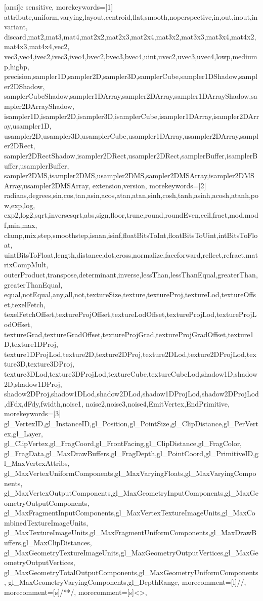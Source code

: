  
[ansi]{c}{%
  sensitive,
  morekeywords=[1]{%
    attribute,uniform,varying,layout,centroid,flat,smooth,noperspective,in,out,inout,invariant,
    discard,mat2,mat3,mat4,mat2x2,mat2x3,mat2x4,mat3x2,mat3x3,mat3x4,mat4x2,mat4x3,mat4x4,vec2,
    vec3,vec4,ivec2,ivec3,ivec4,bvec2,bvec3,bvec4,uint,uvec2,uvec3,uvec4,lowp,mediump,highp,
    precision,sampler1D,sampler2D,sampler3D,samplerCube,sampler1DShadow,sampler2DShadow,
    samplerCubeShadow,sampler1DArray,sampler2DArray,sampler1DArrayShadow,sampler2DArrayShadow,
    isampler1D,isampler2D,isampler3D,isamplerCube,isampler1DArray,isampler2DArray,usampler1D,
    usampler2D,usampler3D,usamplerCube,usampler1DArray,usampler2DArray,sampler2DRect,
    sampler2DRectShadow,isampler2DRect,usampler2DRect,samplerBuffer,isamplerBuffer,usamplerBuffer,
    sampler2DMS,isampler2DMS,usampler2DMS,sampler2DMSArray,isampler2DMSArray,usampler2DMSArray,
    extension,version},
  morekeywords=[2]{%
    radians,degrees,sin,cos,tan,asin,acos,atan,atan,sinh,cosh,tanh,asinh,acosh,atanh,pow,exp,log,
    exp2,log2,sqrt,inversesqrt,abs,sign,floor,trunc,round,roundEven,ceil,fract,mod,modf,min,max,
    clamp,mix,step,smoothstep,isnan,isinf,floatBitsToInt,floatBitsToUint,intBitsToFloat,
    uintBitsToFloat,length,distance,dot,cross,normalize,faceforward,reflect,refract,matrixCompMult,
    outerProduct,transpose,determinant,inverse,lessThan,lessThanEqual,greaterThan,greaterThanEqual,
    equal,notEqual,any,all,not,textureSize,texture,textureProj,textureLod,textureOffset,texelFetch,
    texelFetchOffset,textureProjOffset,textureLodOffset,textureProjLod,textureProjLodOffset,
    textureGrad,textureGradOffset,textureProjGrad,textureProjGradOffset,texture1D,texture1DProj,
    texture1DProjLod,texture2D,texture2DProj,texture2DLod,texture2DProjLod,texture3D,texture3DProj,
    texture3DLod,texture3DProjLod,textureCube,textureCubeLod,shadow1D,shadow2D,shadow1DProj,
    shadow2DProj,shadow1DLod,shadow2DLod,shadow1DProjLod,shadow2DProjLod,dFdx,dFdy,fwidth,noise1,
    noise2,noise3,noise4,EmitVertex,EndPrimitive},
  morekeywords=[3]{%
    gl_VertexID,gl_InstanceID,gl_Position,gl_PointSize,gl_ClipDistance,gl_PerVertex,gl_Layer,
    gl_ClipVertex,gl_FragCoord,gl_FrontFacing,gl_ClipDistance,gl_FragColor,
    gl_FragData,gl_MaxDrawBuffers,gl_FragDepth,gl_PointCoord,gl_PrimitiveID,gl_MaxVertexAttribs,
    gl_MaxVertexUniformComponents,gl_MaxVaryingFloats,gl_MaxVaryingComponents,
    gl_MaxVertexOutputComponents,gl_MaxGeometryInputComponents,gl_MaxGeometryOutputComponents,
    gl_MaxFragmentInputComponents,gl_MaxVertexTextureImageUnits,gl_MaxCombinedTextureImageUnits,
    gl_MaxTextureImageUnits,gl_MaxFragmentUniformComponents,gl_MaxDrawBuffers,gl_MaxClipDistances,
    gl_MaxGeometryTextureImageUnits,gl_MaxGeometryOutputVertices,gl_MaxGeometryOutputVertices,
    gl_MaxGeometryTotalOutputComponents,gl_MaxGeometryUniformComponents,
    gl_MaxGeometryVaryingComponents,gl_DepthRange},
  morecomment=[l]{//},
  morecomment=[s]{/*}{*/},
  morecomment=[s]{<}{>},
}


